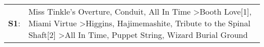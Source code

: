 \begin{supertabular}{p{0.03\textwidth}p{0.92\textwidth}}
 \textbf{S1}:  &  Miss Tinkle's Overture\textsuperscript{}, \enspace Conduit\textsuperscript{}, \enspace All In Time\textsuperscript{} \textgreater \enspace Booth Love[1]\textsuperscript{}, \enspace Miami Virtue\textsuperscript{} \textgreater \enspace Higgins\textsuperscript{}, \enspace Hajimemashite\textsuperscript{}, \enspace Tribute to the Spinal Shaft[2]\textsuperscript{} \textgreater \enspace All In Time\textsuperscript{}, \enspace Puppet String\textsuperscript{}, \enspace Wizard Burial Ground\textsuperscript{}  \enspace  \\
\end{supertabular}
